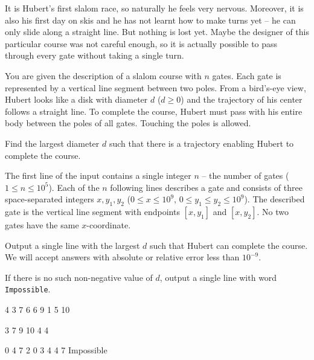 





It is Hubert's first slalom race, so naturally he feels very nervous. Moreover,
it is also his first day on skis and he has not learnt how to make turns yet --
he can only slide along a straight line. But nothing is lost yet. Maybe the
designer of this particular course was not careful enough, so it is actually
possible to pass through every gate without taking a single turn.



You are given the description of a slalom course with $n$ gates. Each gate is
represented by a vertical line segment between two poles. From a bird's-eye
view, Hubert looks like a disk with diameter $d$ ($d \geq 0$) and the trajectory
of his center follows a straight line. To complete the course, Hubert must pass
with his entire body between the poles of all gates. Touching the poles is
allowed.

Find the largest diameter $d$ such that there is a trajectory enabling Hubert to
complete the course.



The first line of the input contains a single integer $n$ -- the number of gates
($1 \leq n \leq 10^5$). Each of the $n$ following lines describes a gate and
consists of three space-separated integers $x, y_1, y_2$ ($0 \leq x \leq 10^9$,
$0 \leq y_1 \leq y_2 \leq 10^9$). The described gate is the vertical line
segment with endpoints $[x, y_1]$ and $[x, y_2]$. No two gates have the same
$x$-coordinate.



Output a single line with the largest $d$ such that Hubert can complete the
course. We will accept answers with absolute or relative error less than
$10^{-9}$.

If there is no such non-negative value of $d$, output a single line with word
\texttt{Impossible}.



4 3 7
6 6 9
1 5 10
\sampleEND

3 7 9
10 4 4
\sampleEND

0 4 7
2 0 3
4 4 7
\sampleOUT
Impossible
\sampleEND




